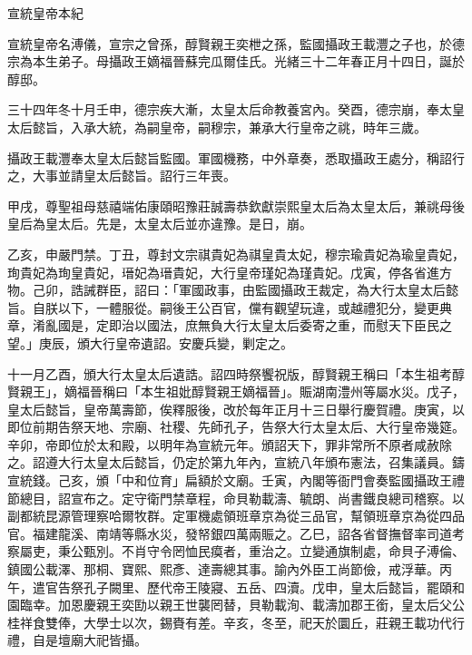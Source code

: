 
\begin{pinyinscope}
宣統皇帝本紀

宣統皇帝名溥儀，宣宗之曾孫，醇賢親王奕枻之孫，監國攝政王載灃之子也，於德宗為本生弟子。母攝政王嫡福晉蘇完瓜爾佳氏。光緒三十二年春正月十四日，誕於醇邸。

三十四年冬十月壬申，德宗疾大漸，太皇太后命教養宮內。癸酉，德宗崩，奉太皇太后懿旨，入承大統，為嗣皇帝，嗣穆宗，兼承大行皇帝之祧，時年三歲。

攝政王載灃奉太皇太后懿旨監國。軍國機務，中外章奏，悉取攝政王處分，稱詔行之，大事並請皇太后懿旨。詔行三年喪。

甲戌，尊聖祖母慈禧端佑康頤昭豫莊誠壽恭欽獻崇熙皇太后為太皇太后，兼祧母後皇后為皇太后。先是，太皇太后並亦違豫。是日，崩。

乙亥，申嚴門禁。丁丑，尊封文宗祺貴妃為祺皇貴太妃，穆宗瑜貴妃為瑜皇貴妃，珣貴妃為珣皇貴妃，瑨妃為瑨貴妃，大行皇帝瑾妃為瑾貴妃。戊寅，停各省進方物。己卯，誥誡群臣，詔曰：「軍國政事，由監國攝政王裁定，為大行太皇太后懿旨。自朕以下，一體服從。嗣後王公百官，儻有觀望玩違，或越禮犯分，變更典章，淆亂國是，定即治以國法，庶無負大行太皇太后委寄之重，而慰天下臣民之望。」庚辰，頒大行皇帝遺詔。安慶兵變，剿定之。

十一月乙酉，頒大行太皇太后遺誥。詔四時祭饗祝版，醇賢親王稱曰「本生祖考醇賢親王」，嫡福晉稱曰「本生祖妣醇賢親王嫡福晉」。賑湖南澧州等屬水災。戊子，皇太后懿旨，皇帝萬壽節，俟釋服後，改於每年正月十三日舉行慶賀禮。庚寅，以即位前期告祭天地、宗廟、社稷、先師孔子，告祭大行太皇太后、大行皇帝幾筵。辛卯，帝即位於太和殿，以明年為宣統元年。頒詔天下，罪非常所不原者咸赦除之。詔遵大行太皇太后懿旨，仍定於第九年內，宣統八年頒布憲法，召集議員。鑄宣統錢。己亥，頒「中和位育」扁額於文廟。壬寅，內閣等衙門會奏監國攝政王禮節總目，詔宣布之。定守衛門禁章程，命貝勒載濤、毓朗、尚書鐵良總司稽察。以副都統昆源管理察哈爾牧群。定軍機處領班章京為從三品官，幫領班章京為從四品官。福建龍溪、南靖等縣水災，發帑銀四萬兩賑之。乙巳，詔各省督撫督率司道考察屬吏，秉公甄別。不肖守令罔恤民瘼者，重治之。立變通旗制處，命貝子溥倫、鎮國公載澤、那桐、寶熙、熙彥、達壽總其事。諭內外臣工尚節儉，戒浮華。丙午，遣官告祭孔子闕里、歷代帝王陵寢、五岳、四瀆。戊申，皇太后懿旨，罷頤和園臨幸。加恩慶親王奕劻以親王世襲罔替，貝勒載洵、載濤加郡王銜，皇太后父公桂祥食雙俸，大學士以次，錫賚有差。辛亥，冬至，祀天於圜丘，莊親王載功代行禮，自是壇廟大祀皆攝。


\end{pinyinscope}
